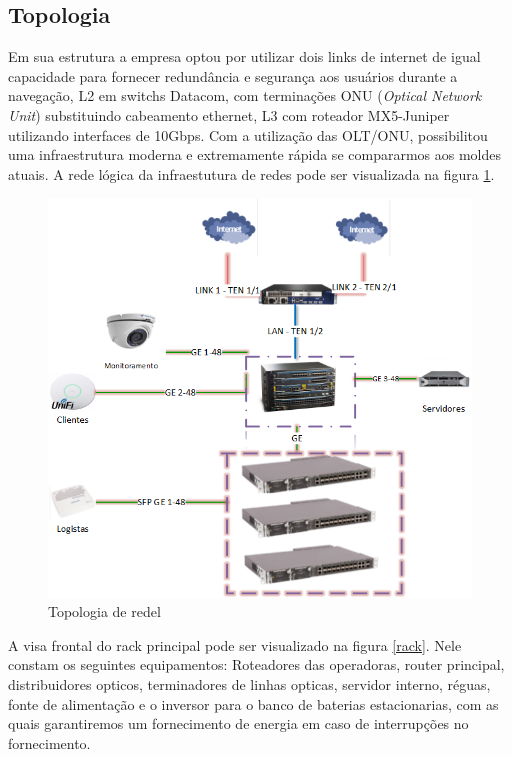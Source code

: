 \documentclass[	DIV=calc,%
							paper=a4,%
							fontsize=12pt,%
							onecolumn]{scrartcl}	 					%
\begin{document}
\subsection{Topologia}
Em sua estrutura a empresa optou por utilizar dois links de internet de igual capacidade para fornecer redundância e segurança aos usuários durante a navegação, L2 em switchs Datacom, com terminações ONU (\textit{Optical Network Unit}) substituindo cabeamento ethernet, L3 com roteador  MX5-Juniper utilizando interfaces de 10Gbps. 
Com a utilização das OLT/ONU, possibilitou uma infraestrutura moderna e extremamente rápida se compararmos aos moldes atuais.
A rede lógica da infraestutura de redes pode ser visualizada na figura \ref{topologia}.
\begin{figure}
\centering
\includegraphics[width=\textwidth]{topologia}
\caption{Topologia de redel}
\label{topologia}
\end{figure}

A visa frontal do rack principal pode ser visualizado na figura \ref{rack}. Nele constam os seguintes equipamentos: Roteadores das operadoras,  router principal, distribuidores opticos, terminadores de linhas opticas, servidor interno, réguas, fonte de alimentação e o inversor para o banco de baterias estacionarias, com as quais garantiremos um fornecimento de energia em caso de interrupções no fornecimento.
\end{document}
